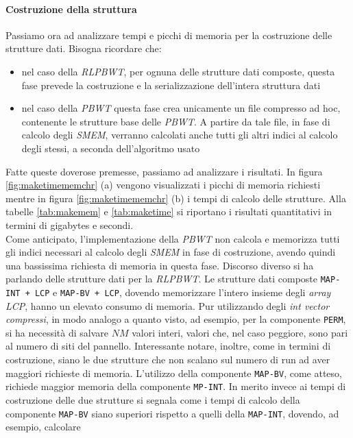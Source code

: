 \paragraph{Costruzione della struttura}
Passiamo ora ad analizzare tempi e picchi di memoria per la costruzione delle
strutture dati. Bisogna ricordare che:
\begin{itemize}
  \item nel caso della \textit{RLPBWT}, per ognuna delle strutture dati
  composte, questa fase prevede la costruzione e la 
  serializzazione dell'intera struttura dati
  \item nel caso della \textit{PBWT} questa fase crea unicamente un file
  compresso ad hoc, contenente le strutture base delle \textit{PBWT}. A partire
  da tale file, in fase di calcolo degli \textit{SMEM}, verranno calcolati anche
  tutti gli altri indici al calcolo degli stessi, a seconda dell'algoritmo usato
\end{itemize}
Fatte queste doverose premesse, passiamo ad analizzare i risultati.
In figura \ref{fig:maketimememchr} (a) vengono visualizzati i picchi di
memoria richiesti mentre in figura \ref{fig:maketimememchr} (b) i tempi di
calcolo delle strutture. Alla tabelle \ref{tab:makemem} e \ref{tab:maketime} si
riportano i risultati quantitativi in termini di gigabytes e secondi.\\ 
Come anticipato, l'implementazione della \textit{PBWT} non calcola e memorizza
tutti gli indici 
necessari al calcolo degli \textit{SMEM} in fase di costruzione, avendo quindi
una bassissima richiesta di memoria in questa fase. Discorso diverso si ha
parlando delle strutture dati per la \textit{RLPBWT}. Le strutture dati composte
\texttt{MAP-INT + LCP} e \texttt{MAP-BV + LCP}, dovendo 
memorizzare l'intero insieme degli \textit{array LCP}, hanno un elevato
consumo di memoria. Pur utilizzando degli \textit{int vector compressi}, in modo
analogo a quanto visto, ad esempio, per la componente \texttt{PERM}, si ha
necessità di salvare $NM$ valori interi, valori che, nel caso peggiore, sono
pari al numero di siti del pannello. Interessante notare, inoltre, come in
termini di costruzione, siano le due strutture che non scalano sul numero di run
ad aver maggiori richieste di memoria. L'utilizzo della componente
\texttt{MAP-BV}, come atteso, richiede maggior memoria della componente
\texttt{MP-INT}. In merito invece ai tempi di costruzione delle due strutture si
segnala come i tempi di calcolo della componente \texttt{MAP-BV} siano superiori
rispetto a quelli della \texttt{MAP-INT}, dovendo, ad esempio, calcolare
